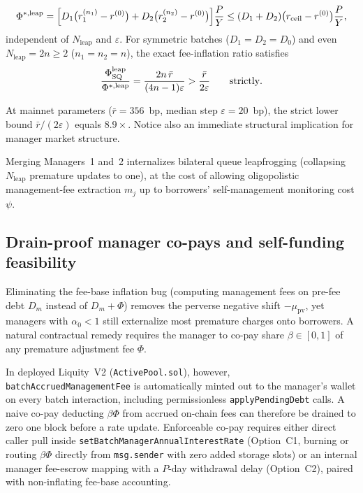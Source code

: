 \begin{theorem}
\begin{enumerate}[label=(\roman*), leftmargin=2.2em, itemsep=2pt]
\begin{equation}\label{eq:leap_astar}
\Phi^{*,\mathrm{leap}} = \Bigl[D_1\bigl(r_1^{(n_1)} - r^{(0)}\bigr) + D_2\bigl(r_2^{(n_2)} - r^{(0)}\bigr)\Bigr]\frac{P}{Y} \le (D_1 + D_2)\bigl(r_{\mathrm{ceil}} - r^{(0)}\bigr)\frac{P}{Y},
\end{equation}
independent of $N_{\mathrm{leap}}$ and $\varepsilon$. For symmetric batches ($D_1 = D_2 = D_0$) and even $N_{\mathrm{leap}} = 2n \ge 2$ ($n_1 = n_2 = n$), the exact fee-inflation ratio satisfies
\begin{equation}\label{eq:leap_ratio}
\frac{\Phi_{\mathrm{SQ}}^{\mathrm{leap}}}{\Phi^{*,\mathrm{leap}}} = \frac{2n\,\bar{r}}{(4n - 1)\varepsilon} > \frac{\bar{r}}{2\varepsilon} \qquad \textup{strictly}.
\end{equation}
\end{enumerate}
\end{theorem}

At mainnet parameters ($\bar{r} = 356$~bp, median step $\varepsilon = 20$~bp), the strict lower bound $\bar{r}/(2\varepsilon)$ equals $8.9\times$. Notice also an immediate structural implication for manager market structure.

\begin{corollary}\label{cor:consolidation}
Merging Managers~1 and~2 internalizes bilateral queue leapfrogging (collapsing $N_{\mathrm{leap}}$ premature updates to one), at the cost of allowing oligopolistic management-fee extraction $m_j$ up to borrowers' self-management monitoring cost $\psi$.
\end{corollary}

\subsection{Drain-proof manager co-pays and self-funding feasibility}\label{subsec:copay}

Eliminating the fee-base inflation bug (computing management fees on pre-fee debt $D_m$ instead of $D_m + \Phi$) removes the perverse negative shift $-\mu_{\mathrm{pv}}$, yet managers with $\alpha_0 < 1$ still externalize most premature charges onto borrowers. A natural contractual remedy requires the manager to co-pay share $\beta \in [0, 1]$ of any premature adjustment fee $\Phi$.

In deployed Liquity~V2 (\texttt{ActivePool.sol}), however, \texttt{batchAccruedManagementFee} is automatically minted out to the manager's wallet on every batch interaction, including permissionless \texttt{applyPendingDebt} calls. A naive co-pay deducting $\beta \Phi$ from accrued on-chain fees can therefore be drained to zero one block before a rate update. Enforceable co-pay requires either direct caller pull inside \texttt{setBatchManagerAnnualInterestRate} (Option~C1, burning or routing $\beta \Phi$ directly from \texttt{msg.sender} with zero added storage slots) or an internal manager fee-escrow mapping with a $P$-day withdrawal delay (Option~C2), paired with non-inflating fee-base accounting.

